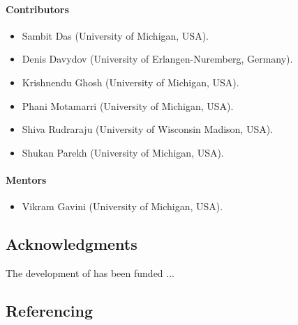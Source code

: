 \paragraph{Contributors}
\begin{itemize}
	\item Sambit Das (University of Michigan, USA).
	\item Denis Davydov (University of Erlangen-Nuremberg, Germany).
	\item Krishnendu Ghosh (University of Michigan, USA).
	\item Phani Motamarri (University of Michigan, USA).
	\item Shiva Rudraraju (University of Wisconsin Madison, USA).
	\item Shukan Parekh (University of Michigan, USA). 	
\end{itemize}

\paragraph{Mentors}
\begin{itemize}
	\item Vikram Gavini (University of Michigan, USA).
\end{itemize}

\subsection{Acknowledgments}
The development of \dftfe{} has been funded ...



\subsection{Referencing \dftfe{}}
